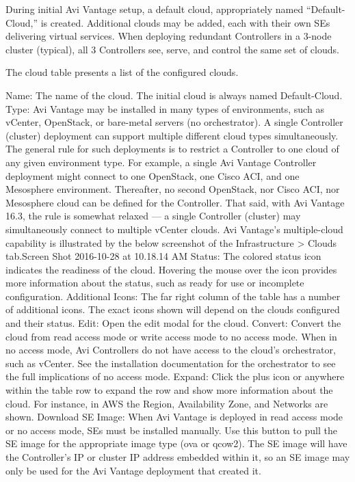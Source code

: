 \documentclass[letterpaper,10pt,english]{sphinxmanual}
\begin{document}
During initial Avi Vantage setup, a default cloud, appropriately named ``Default-Cloud,'' is created. Additional clouds may be added, each with their own SEs delivering virtual services. When deploying redundant Controllers in a 3-node cluster (typical), all 3 Controllers see, serve, and control the same set of clouds.

The cloud table presents a list of the configured clouds.

Name: The name of the cloud. The initial cloud is always named Default-Cloud.
Type: Avi Vantage may be installed in many types of environments, such as vCenter, OpenStack, or bare-metal servers (no orchestrator). A single Controller (cluster) deployment can support multiple different cloud types simultaneously.  The general rule for such deployments is to restrict a Controller to one cloud of any given environment type. For example, a single Avi Vantage Controller deployment might connect to one OpenStack, one Cisco ACI, and one Mesosphere environment. Thereafter, no second OpenStack, nor Cisco ACI, nor Mesosphere cloud can be defined for the Controller. That said, with Avi Vantage 16.3, the rule is somewhat relaxed — a single Controller (cluster) may simultaneously connect to multiple vCenter clouds. Avi Vantage's multiple-cloud capability is illustrated by the below screenshot of the Infrastructure \textgreater{} Clouds tab.Screen Shot 2016-10-28 at 10.18.14 AM
Status: The colored status icon indicates the readiness of the cloud. Hovering the mouse over the icon provides more information about the status, such as ready for use or incomplete configuration.
Additional Icons: The far right column of the table has a number of additional icons. The exact icons shown will depend on the clouds configured and their status.
Edit: Open the edit modal for the cloud.
Convert: Convert the cloud from read access mode or write access mode to no access mode. When in no access mode, Avi Controllers do not have access to the cloud's orchestrator, such as vCenter. See the installation documentation for the orchestrator to see the full implications of no access mode.
Expand: Click the plus icon or anywhere within the table row to expand the row and show more information about the cloud. For instance, in AWS the Region, Availability Zone, and Networks are shown.
Download SE Image: When Avi Vantage is deployed in read access mode or no access mode, SEs must be installed manually. Use this button to pull the SE image for the appropriate image type (ova or qcow2). The SE image will have the Controller's IP or cluster IP address embedded within it, so an SE image may only be used for the Avi Vantage deployment that created it.
\end{document}
